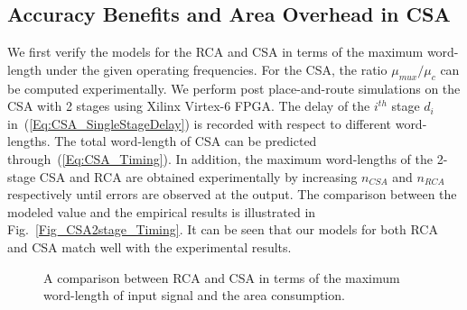 \documentclass[prodmode,acmtrets]{acmsmall} %
\begin{document}
\subsection{Accuracy Benefits and Area Overhead in CSA}
We first verify the models for the RCA and CSA in terms of the maximum word-length under the given operating frequencies. For the CSA, the ratio $\mu_{mux}/\mu_c$ can be computed experimentally. We perform post place-and-route simulations on the CSA with 2 stages using Xilinx Virtex-6 FPGA. The delay of the $i^{th}$ stage $d_i$ in~(\ref{Eq:CSA_SingleStageDelay}) is recorded with respect to different word-lengths. The total word-length of CSA can be predicted through~(\ref{Eq:CSA_Timing}). In addition, the maximum word-lengths of the 2-stage CSA and RCA are obtained experimentally by increasing $n_{CSA}$ and $n_{RCA}$ respectively until errors are observed at the output. The comparison between the modeled value and the empirical results is illustrated in Fig.~\ref{Fig_CSA2stage_Timing}. It can be seen that our models for both RCA and CSA match well with the experimental results.
%
\begin{figure}[htbp]
        \centering
        \vspace{-3ex}
        \vspace{-1.5ex}
    \caption{A comparison between RCA and CSA in terms of the maximum word-length of input signal and the area consumption.}
\end{figure}
\end{document}
